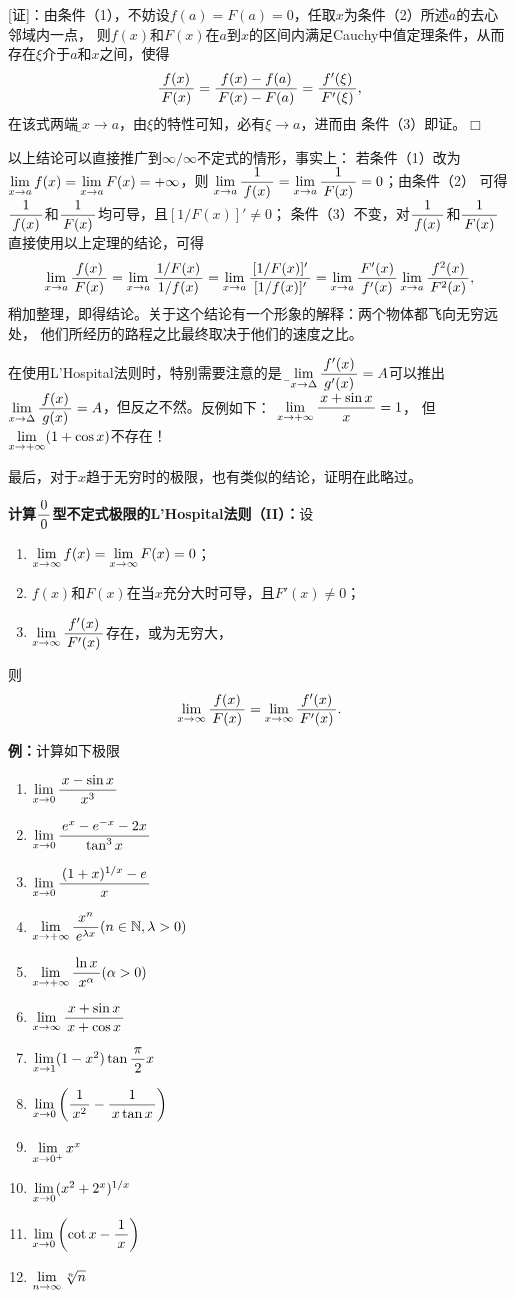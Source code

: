 [证]：由条件（1），不妨设$f(a)=F(a)=0$，任取$x$为条件（2）所述$a$的去心邻域内一点，
则$f(x)$和$F(x)$在$a$到$x$的区间内满足Cauchy中值定理条件，从而
存在$\xi$介于$a$和$x$之间，使得
$$\df{f(x)}{F(x)}=\df{f(x)-f(a)}{F(x)-F(a)}
=\df{f'(\xi)}{F'(\xi)},$$
在该式两端{\b 令$x\to a$，由$\xi$的特性可知，必有$\xi\to a$}，进而由
条件（3）即证。\hfill$\Box$

以上结论可以直接推广到$\infty/\infty$不定式的情形，事实上：
若条件（1）改为$\limx{a}f(x)=\limx{a}F(x)=+\infty$，则
$\limx{a}\df1{f(x)}=\limx{a}\df1{F(x)}=0$；由条件（2）
可得$\df1{f(x)}$和$\df1{F(x)}$均可导，且$[1/F(x)]'\ne 0$；
条件（3）不变，对$\df1{f(x)}$和$\df1{F(x)}$直接使用以上定理的结论，可得
$$
	\limx{a}\df{f(x)}{F(x)}
	=\limx{a}\df{1/F(x)}{1/f(x)}
	=\limx{a}\df{[1/F(x)]'}{[1/f(x)]'}
	=\limx{a}\df{F'(x)}{f'(x)}\limx{a}\df{f^2(x)}{F^2(x)},
$$
稍加整理，即得结论。关于这个结论有一个形象的解释：两个物体都飞向无穷远处，
他们所经历的路程之比最终取决于他们的速度之比。

在使用L'Hospital法则时，特别需要注意的是
{\b 由$\limx{\Delta}\df{f'(x)}{g'(x)}=A$可以推出
$\limx{\Delta}\df{f(x)}{g(x)}=A$，但反之不然。}反例如下：
$\limx{+\infty}\df{x+\sin x}x=1$，
但$\limx{+\infty}(1+\cos x)$不存在！

最后，对于$x$趋于无穷时的极限，也有类似的结论，证明在此略过。

\begin{thx}
	{\bf 计算$\df00$型不定式极限的L'Hospital法则（II）：}设
	\begin{enumerate}[(1)]
	  \item $\limx{\infty}f(x)=\limx{\infty}F(x)=0$；
	  \item $f(x)$和$F(x)$在当$x$充分大时可导，且$F'(x)\ne0$；
	  \item $\limx{\infty}\df{f'(x)}{F'(x)}$存在，或为无穷大，
	\end{enumerate}
	则
	$$\limx{\infty}\df{f(x)}{F(x)}=\limx{\infty}\df{f'(x)}{F'(x)}.$$
\end{thx}

{\bf 例：}计算如下极限
\begin{enumerate}[(1)]
  \setlength{\itemindent}{1cm}
  \item $\limx{0}\df{x-\sin x}{x^3}$ 
  \item $\limx{0}\df{e^x-e^{-x}-2x}{\tan^3x}$ 
  \item $\limx{0}\df{(1+x)^{1/x}-e}{x}$ 
  \item $\limx{+\infty}\df{x^n}{e^{\lambda
  x}}(n\in\mathbb{N},\lambda>0)$ 
  \item $\limx{+\infty}\df{\ln x}{x^\alpha}(\alpha>0)$ 
  \item $\limx{\infty}\df{x+\sin x}{x+\cos x}$
  \item $\limx{1}(1-x^2)\tan\df{\pi}{2}x$ 
  \item $\limx{0}\left(\df 1{x^2}-\df 1{x\tan x}\right)$ 
  \item $\limx{0^+}x^x$
  \item $\limx{0}(x^2+2^x)^{1/x}$ 
  \item $\limx{0}\left(\cot x-\df 1x\right)$ 
  \item $\limn\sqrt[n]n$
\end{enumerate}

